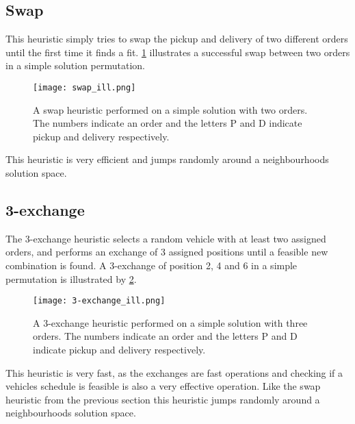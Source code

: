 \documentclass[../main.tex]{subfiles}
\begin{document}
\subsection{Swap}
\label{sec:swap}
This heuristic simply tries to swap the pickup and delivery of two different orders until the first time it finds a fit. 
\cref{fig:swap} illustrates a successful swap between two orders in a simple solution permutation. 

\begin{figure}                                                                                     
 \centering                                                                                     
 \texttt{[image: swap\_ill.png]}                                     
 \label{fig:swap}                                                                            
 \caption{A swap heuristic performed on a simple solution with two orders. The numbers indicate an order and the letters P and D indicate pickup and delivery respectively.}
\end{figure}

This heuristic is very efficient and jumps randomly around a neighbourhoods solution space.

\subsection{3-exchange}
\label{sec:exch}
The 3-exchange heuristic selects a random vehicle with at least two assigned orders, and performs an exchange of 3 assigned positions until a feasible new combination is found. A 3-exchange of position 2, 4 and 6 in a simple permutation is illustrated by \cref{fig:exch}. \newline

\begin{figure}                                                                                     
 \centering                                                                                     
 \texttt{[image: 3-exchange\_ill.png]}                                     
 \label{fig:exch}                                                                            
 \caption{A 3-exchange heuristic performed on a simple solution with three orders. The numbers indicate an order and the letters P and D indicate pickup and delivery respectively.}
\end{figure}

This heuristic is very fast, as the exchanges are fast operations and checking if a vehicles schedule is feasible is also a very effective operation. Like the swap heuristic from the previous section this heuristic jumps randomly around a neighbourhoods solution space.
\end{document}
